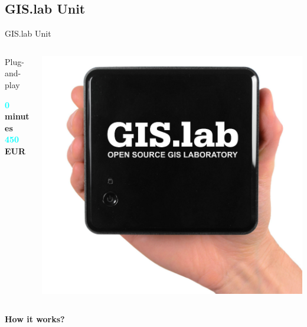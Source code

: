 \documentclass[12pt]{beamer}
\begin{document}
\subsection{GIS.lab Unit}
\begin{frame}{GIS.lab Unit}
	\begin{minipage}[\textheight]{\textwidth}
	\begin{columns}[T]
		\begin{column}{0.5\textwidth}
			\vspace{0.2\textheight}
			Plug-and-play
			\begin{flushleft}
				\textbf{\textcolor{Cyan}{0} minutes} \\
				\textbf{\textcolor{Cyan}{450} EUR} \\
			\end{flushleft}
		\end{column}
		\begin{column}{0.5\textwidth}
			\includegraphics[keepaspectratio=true,width=\textwidth]{images/gislab-unit.png}
		\end{column}
	\end{columns}
	\end{minipage}
\end{frame}


\begin{frame}
	\LARGE \textbf{How it works?}
\end{frame}
\end{document}
